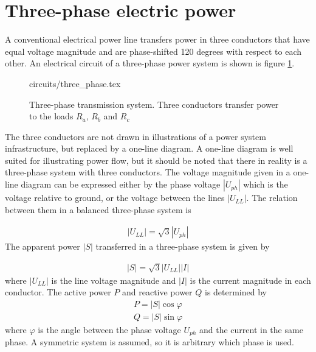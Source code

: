 \documentclass[class=book, crop=false]{standalone}
\begin{document}
\section{Three-phase electric power}
A conventional electrical power line transfers power in three conductors that have equal voltage magnitude and are phase-shifted 120 degrees with respect to each other. An electrical circuit of a three-phase power system is shown is figure \ref{fig:theory:three_phase}.

\begin{figure}[ht!]
    \center
    {circuits/three_phase.tex}
    \caption[size = 9]
    {Three-phase transmission system. Three conductors transfer power to the loads $R_{a}$, $R_{b}$ and $R_{c}$}\label{fig:theory:three_phase}
\end{figure}

The three conductors are not drawn in illustrations of a power system infrastructure, but replaced by a one-line diagram. A one-line diagram is well suited for illustrating power flow, but it should be noted that there in reality is a three-phase system with three conductors. The voltage magnitude given in a one-line diagram can be expressed either by the phase voltage $|U_{ph}|$ which is the voltage relative to ground, or the voltage between the lines $|U_{LL}|$. The relation between them in a balanced three-phase system is

\begin{equation}
   \begin{aligned}\label{eq:theory:three_phase_voltage}
|U_{LL}| = \sqrt{3} |U_{ph}|
\end{aligned} 
\end{equation}
The apparent power $|S|$ transferred in a three-phase system is given by

\begin{equation}
   \begin{aligned}\label{eq:theory:three_phase_power}
|S| = \sqrt{3}|U_{LL}||I| 
\end{aligned} 
\end{equation}
where $|U_{LL}|$ is the line voltage magnitude and $|I|$ is the current magnitude in each conductor. The active power $P$ and reactive power $Q$ is determined by 
\begin{equation}
   \begin{aligned}\label{eq:theory:three_phase_reactive}
P = |S|\cos{\varphi} \\
Q = |S|\sin{\varphi} 
\end{aligned} 
\end{equation}
where $\varphi$ is the angle between the phase voltage $U_{ph}$ and the current in the same phase. A symmetric system is assumed, so it is arbitrary which phase is used. 
\end{document}

